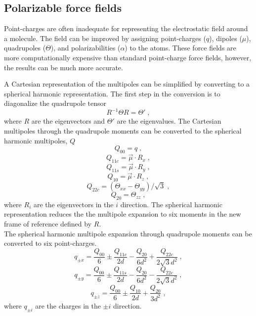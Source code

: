 \documentclass[12pt]{report}
\begin{document}
\subsection{Polarizable force fields}

Point-charges are often inadequate for representing the electrostatic field
around a molecule. The field can be improved by assigning point-charges ($q$),
dipoles ($\mu$), quadrupoles ($\Theta$), and polarizabilities ($\alpha$) to
the atoms. These force fields are more computationally expensive than standard
point-charge force fields, however, the results can be much more accurate.

A Cartesian representation of the multipoles can be simplified by converting
to a spherical harmonic representation. The first step in the conversion is to
diagonalize the quadrupole tensor
\begin{equation}
 R^{-1}\Theta R = \Theta' \; ,
\end{equation}
where $R$ are the eigenvectors and $\Theta'$ are the eigenvalues. The
Cartesian multipoles through the quadrupole moments can be converted to the
spherical harmonic multipoles, $Q$
\begin{equation}
 Q_{00} = q \; ,
\end{equation}
\begin{equation}
 Q_{11c} = \vec \mu \cdot R_x \; ,
\end{equation}
\begin{equation}
 Q_{11s} = \vec \mu \cdot R_y \; ,
\end{equation}
\begin{equation}
 Q_{10} = \vec \mu \cdot R_z \; ,
\end{equation}
\begin{equation}
 Q_{22c} = (\Theta_{xx}-\Theta_{yy})/\sqrt{3} \; ,
\end{equation}
\begin{equation}
 Q_{20} = \Theta_{zz} \; ,
\end{equation}
where $R_i$ are the eigenvectors in the $i$ direction. The spherical harmonic
representation reduces the the multipole expansion to six moments in the new
frame of reference defined by $R$. \\

The spherical harmonic multipole expansion through quadrupole moments can be
converted to six point-charges.
\begin{equation}
 q_{\pm x} = \frac{Q_{00}}{6} \pm \frac{Q_{11c}}{2d} -
          \frac{Q_{20}}{6d^2} + \frac{Q_{22c}}{2\sqrt{3}d^2} \; ,
\end{equation}
\begin{equation}
 q_{\pm y} = \frac{Q_{00}}{6} \pm \frac{Q_{11s}}{2d} -
          \frac{Q_{20}}{6d^2} - \frac{Q_{22c}}{2\sqrt{3}d^2} \; ,
\end{equation}
\begin{equation}
 q_{\pm z} = \frac{Q_{00}}{6} \pm \frac{Q_{10}}{2d} +
          \frac{Q_{20}}{3d^2} \; ,
\end{equation}
where $q_{\pm i}$ are the charges in the $\pm i$ direction.
\end{document}
